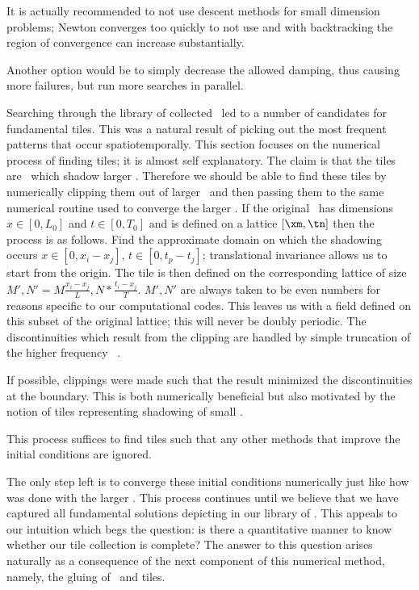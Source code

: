 It is actually recommended to not use descent methods for small dimension problems; Newton
converges too quickly to not use and with backtracking the region of convergence can
increase substantially.


Another option would be to simply decrease the allowed damping, thus causing more failures,
but run more searches in parallel.

Searching through the library of collected \twots\ led to a number of candidates
for fundamental tiles. This was a natural result of picking out the most frequent patterns
that occur spatiotemporally. This section focuses on the numerical process of finding tiles;
it is almost self explanatory. The claim is that the tiles are \twots\ which shadow larger \twots.
Therefore we should be able to find these tiles by numerically clipping them out of larger \twots\
and then passing them to the same numerical routine used to converge the larger \twot. If
the original \twot\ has dimensions $x \in [0, L_0]$ and $t \in [0, T_0]$ and is defined on
a lattice $[\xm, \tn]$ then the process is as follows. Find the approximate domain on which
the shadowing occurs $x \in [0, x_{i}-x_{j}]$, $t \in [0, t_{p}-t_{j}]$; translational invariance allows
us to start from the origin. The tile is then defined on the corresponding lattice of size
$M', N' = M \frac{x_{i}-x_{j}}{L}, N * \frac{t_{i}-x_{j}}{T}$.
$M', N'$ are always taken to be even numbers for reasons specific to our computational codes.
This leaves us with a field defined on this subset of the original lattice;
this will never be doubly periodic. The discontinuities which result from
the clipping are handled by simple truncation of the higher
frequency \spt\ \Fcs.


If possible, clippings were made such that the result minimized the discontinuities at
the boundary. This is both numerically beneficial but also motivated by the notion
of tiles representing shadowing of small \twots.

This process suffices to find tiles such that any other methods that
improve the initial conditions are ignored.

The only step left is to converge these initial conditions numerically
just like how was done with the larger \twots.
This process continues until we believe that we have captured all
fundamental solutions depicting in our library of \twots.
This appeals to our intuition which begs the question: is there a quantitative
manner to know whether our tile collection is complete? The answer to this
question arises naturally as a consequence of the next component of this numerical method,
namely, the gluing of \twots\ and tiles.


